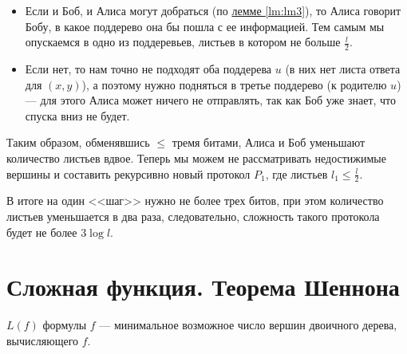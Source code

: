 \begin{proof*}
\begin{itemize}
			\begin{itemize}
				\item Если и Боб, и Алиса могут добраться (по \hyperref[lm:lm3]{лемме \ref{lm:lm3}}), то Алиса говорит Бобу, в какое поддерево она бы пошла с ее информацией. Тем самым мы опускаемся в одно из поддеревьев, листьев в котором не больше $ \frac{l}{2}$.
				\item Если нет, то нам точно не подходят оба поддерева $ u$ (в них нет листа ответа для $ (x, y)$), а поэтому нужно подняться в третье поддерево (к родителю  $ u$) --- для этого Алиса может ничего не отправлять, так как Боб уже знает, что спуска вниз не будет.
			\end{itemize}
			Таким образом, обменявшись $ \le$ тремя битами, Алиса и Боб уменьшают количество листьев вдвое. Теперь мы можем не рассматривать недостижимые вершины и составить рекурсивно новый протокол $  P_1$, где листьев $ l_1 \le \frac{l}{2}$. 

			В итоге на один <<шаг>> нужно не более трех битов, при этом количество листьев уменьшается в два раза, следовательно, сложность такого протокола будет не более $ 3 \log l$.
	\end{itemize}
\end{proof*}




\section{Сложная функция. Теорема Шеннона}
\begin{defn}
	 $ L(f)$ формулы  $ f$ --- минимальное возможное число вершин двоичного дерева, вычисляющего  $ f$.
\end{defn}


